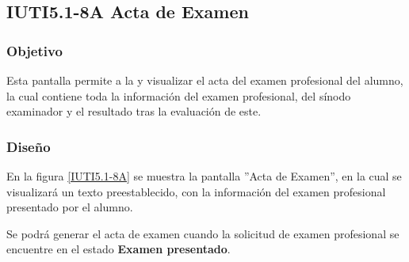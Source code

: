 
\subsection{IUTI5.1-8A Acta de Examen}

\subsubsection{Objetivo}
	Esta pantalla permite a la  y  visualizar el acta del examen profesional del alumno, la cual contiene toda la información del examen profesional, del sínodo examinador y el resultado tras la evaluación de este.

\subsubsection{Diseño}

	En la figura \ref{IUTI5.1-8A} se muestra la pantalla ''Acta de Examen'', en la cual se visualizará un texto preestablecido, con la información del examen profesional presentado por el alumno. 
	
	Se podrá generar el acta de examen cuando la solicitud de examen profesional se encuentre en el estado \textbf{Examen presentado}.

